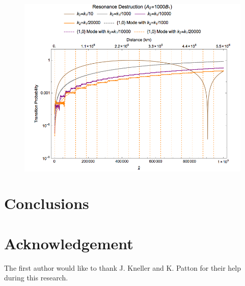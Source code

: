 \documentclass[%
reprint,
 amsmath,amssymb,
 aps,
]{revtex4-1}
\begin{document}
\begin{figure}[!htbp]
                \centering
                \includegraphics[width=\columnwidth]{assets/interference}
                \caption{}
                \label{fig-interference}
\end{figure}



\section{\label{conclusions}Conclusions}






\section{\label{acknowledgement}Acknowledgement}

The first author would like to thank J. Kneller and K. Patton for their help during this research.



 



\end{document}
